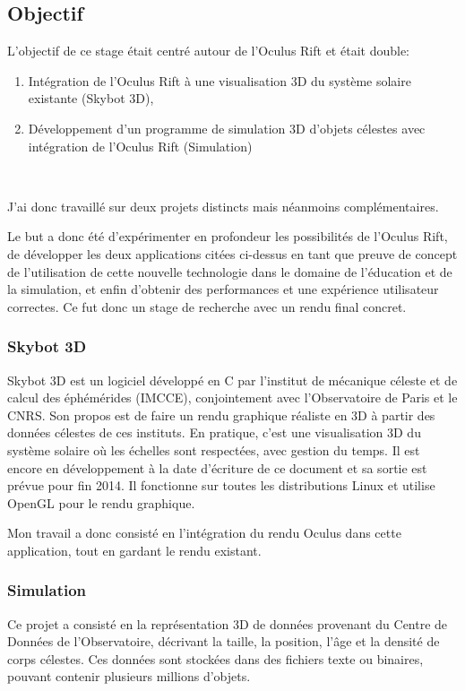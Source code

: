 \documentclass[a4paper,french,12pt]{article}
\begin{document}
	\subsection{Objectif}	
	
		L’objectif de ce stage était centré autour de l'Oculus Rift et était double:\\
		
		\begin{enumerate}
		\item Intégration de l'Oculus Rift à une visualisation 3D du système solaire existante (Skybot 3D),
		\item Développement d'un programme de simulation 3D  d'objets célestes avec intégration de l'Oculus Rift (Simulation)
		\end{enumerate}~
		
		J'ai donc travaillé sur deux projets distincts mais néanmoins complémentaires.
		
		Le but a donc été d'expérimenter en profondeur les possibilités de l'Oculus Rift, de développer 
		les deux applications citées ci-dessus en tant que preuve de concept de l'utilisation de cette nouvelle technologie
		dans le domaine de l'éducation et de la simulation, et enfin d'obtenir des performances et une expérience
		utilisateur correctes. Ce fut donc un stage de recherche avec un rendu final concret.
		
	    \subsubsection{Skybot 3D}
		Skybot 3D est un logiciel développé en C par l'institut de mécanique céleste et de calcul des éphémérides (IMCCE),
		conjointement avec l'Observatoire de Paris et le CNRS. Son propos est de faire un rendu graphique réaliste
		en 3D à partir des données célestes de ces instituts. En pratique, c'est une visualisation 3D du système solaire
		où les échelles sont respectées, avec gestion du temps. Il est encore en développement à la date d'écriture de ce document et
		sa sortie est prévue pour fin 2014.
		Il fonctionne sur toutes les distributions Linux et utilise OpenGL pour le rendu graphique.
		
		Mon travail a donc consisté en l'intégration du rendu Oculus dans cette application, tout en gardant
		le rendu existant.
		
	    \subsubsection{Simulation}
		Ce projet a consisté en la représentation 3D de données provenant du Centre de Données
		de l'Observatoire, décrivant la taille, la position, l'âge et la densité de corps célestes.
		Ces données sont stockées dans des fichiers texte ou binaires, pouvant contenir plusieurs millions
		d'objets.
		
\end{document}
